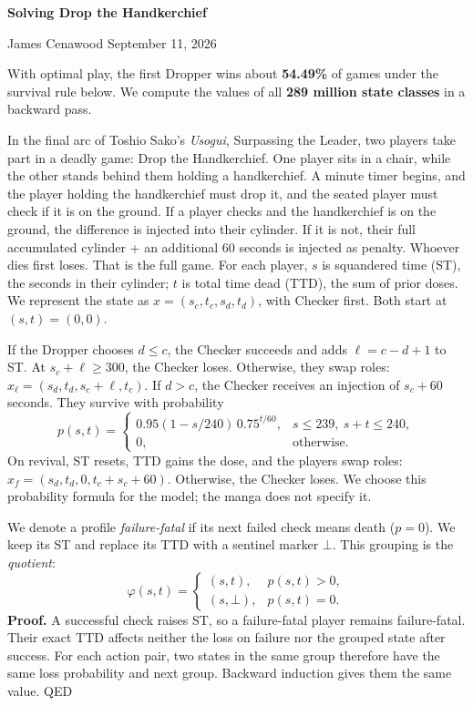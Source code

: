 \documentclass[10pt]{article}
\newcommand{\head}[1]{\par\vspace{5pt}{\fontsize{11}{12}\selectfont\bfseries #1}\par\vspace{2pt}}
\begin{document}
{\LARGE\bfseries Solving Drop the Handkerchief}\par
James Cenawood \hfill September 11, 2026
\vspace{4pt}

With optimal play, the first Dropper wins about \textbf{54.49\%} of games under the survival rule below.
We compute the values of all \textbf{289 million state classes} in a backward pass.

\begin{minipage}[t]{0.55\textwidth}
\vspace{0pt}
\head{1. The game}
In the final arc of Toshio Sako's \emph{Usogui}, Surpassing the Leader, two players take part in a deadly game: Drop the Handkerchief.
One player sits in a chair, while the other stands behind them holding a handkerchief.
A minute timer begins, and the player holding the handkerchief must drop it, and the seated player must check if it is on the ground.
If a player checks and the handkerchief is on the ground, the difference is injected into their cylinder. If it is not, their full accumulated cylinder + an additional
60 seconds is injected as penalty. Whoever dies first loses. That is the full game.
For each player, $s$ is squandered time (ST), the seconds in their cylinder; $t$ is total time dead (TTD), the sum of prior doses.
We represent the state as $x=(s_c,t_c,s_d,t_d)$, with Checker first.
Both start at $(s,t)=(0,0)$.

If the Dropper chooses $d\le c$, the Checker succeeds and adds
$\ell=c-d+1$ to ST. At $s_c+\ell\ge300$, the Checker loses.
Otherwise, they swap roles:
$x_\ell=(s_d,t_d,s_c+\ell,t_c)$.
If $d>c$, the Checker receives an injection of $s_c+60$ seconds.
They survive with probability
\[
p(s,t)=\begin{cases}
0.95(1-s/240)\,0.75^{t/60},&s\le239,\ s+t\le240,\\
0,&\text{otherwise}.
\end{cases}
\]
On revival, ST resets, TTD gains the dose, and the players swap roles:
$x_f=(s_d,t_d,0,t_c+s_c+60)$. Otherwise, the Checker loses.
We choose this probability formula for the model; the manga does not specify it.

\head{2. Equivalence Class}
We denote a profile \emph{failure-fatal} if its next failed check means death ($p=0$).
We keep its ST and replace its TTD with a sentinel marker $\bot$.
This grouping is the \emph{quotient}:
\[
\varphi(s,t)=\begin{cases}(s,t),&p(s,t)>0,\\(s,\bot),&p(s,t)=0.\end{cases}
\]
\textbf{Proof.} A successful check raises ST, so a failure-fatal player
remains failure-fatal. Their exact TTD affects neither the loss on failure
nor the grouped state after success. For each action pair, two states in
the same group therefore have the same loss probability and next group.
Backward induction gives them the same value. \textup{QED}


\end{minipage}
\end{document}
